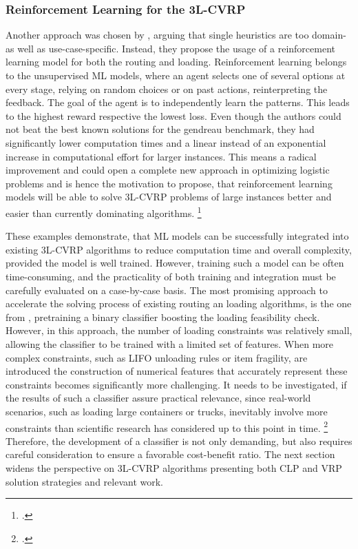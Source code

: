 \subsubsection{Reinforcement Learning for the \gls{3L-CVRP}}
Another approach was chosen by \cite{schoepf_using_2024}, arguing that single heuristics are too domain- as well as use-case-specific.
Instead, they propose the usage of a reinforcement learning model for both the routing and loading. Reinforcement learning belongs
to the unsupervised \gls{ML} models, where an agent selects one of several options at every stage, relying on random choices or
on past actions, reinterpreting the feedback. The goal of the agent is to independently learn
the patterns. This leads to the highest reward respective the lowest loss. Even though the authors could not beat
the best known solutions for the gendreau benchmark, they had significantly lower computation times and
a linear instead of an exponential increase in computational effort for larger instances. This means a radical improvement
and could open a complete new approach in optimizing logistic problems and is hence the motivation to propose, that reinforcement learning
models will be able to solve \gls{3L-CVRP} problems of large instances better and easier than currently dominating
algorithms. \footcite[cf.][]{schoepf_using_2024}

\parbreak

These examples demonstrate, that \gls{ML} models can be successfully integrated into existing \gls{3L-CVRP}
algorithms to reduce computation time and overall complexity, provided the model is well trained.
However, training such a model can be often time-consuming, and the practicality of both training and
integration must be carefully evaluated on a case-by-case basis. The most promising approach to
accelerate the solving process of existing routing an loading algorithms, is the one from \cite{zhang_learning-based_2022},
pretraining a binary classifier boosting the loading feasibility check. However, in this approach,
the number of loading constraints was relatively small, allowing the classifier
to be trained with a limited set of features. When more complex constraints, such as
\gls{LIFO} unloading rules or item fragility, are introduced the construction of numerical features that accurately
represent these constraints becomes significantly more challenging. It needs to be investigated, if
the results of such a classifier assure practical relevance, since real-world
scenarios, such as loading large containers or trucks, inevitably involve
more constraints than scientific research has considered up to this point in time. \footcite[cf.][p. 1f]{bischoff_issues_1995}
Therefore, the development of a classifier is not only demanding, but also
requires careful consideration to ensure a favorable cost-benefit ratio. The next section widens the perspective
on \gls{3L-CVRP} algorithms presenting both \gls{CLP} and \gls{VRP} solution strategies and relevant work.

